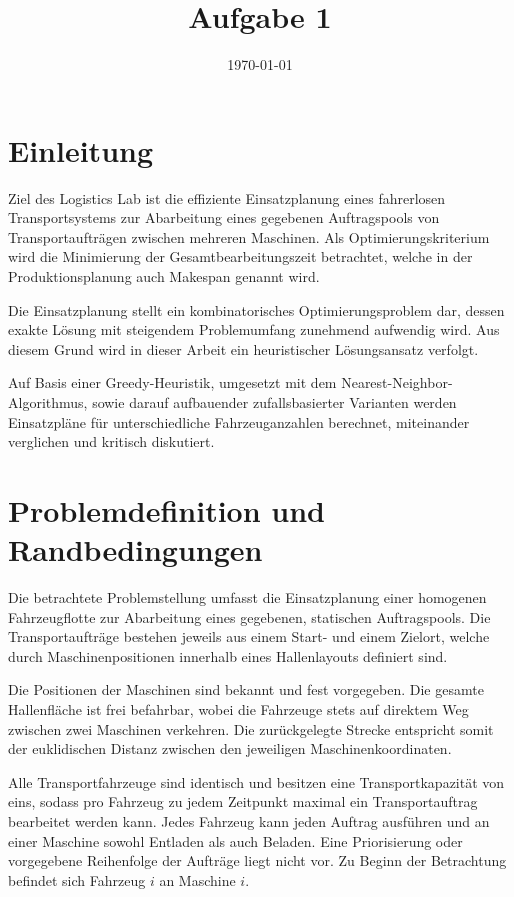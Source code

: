 \documentclass[a4paper,10pt]{article}
\title{Aufgabe 1}
\date{\today}
\begin{document}
\maketitle


\section{Einleitung}

Ziel des Logistics Lab ist die effiziente Einsatzplanung eines fahrerlosen Transportsystems zur
Abarbeitung eines gegebenen Auftragspools von Transportaufträgen zwischen mehreren Maschinen.
Als Optimierungskriterium wird die Minimierung der Gesamtbearbeitungszeit betrachtet, welche in der
Produktionsplanung auch Makespan genannt wird.

Die Einsatzplanung stellt ein kombinatorisches Optimierungsproblem dar, dessen exakte Lösung mit
steigendem Problemumfang zunehmend aufwendig wird. Aus diesem Grund wird in dieser Arbeit ein
heuristischer Lösungsansatz verfolgt.

Auf Basis einer Greedy-Heuristik, umgesetzt mit dem Nearest-Neighbor-Algorithmus, sowie darauf aufbauender
zufallsbasierter Varianten werden Einsatzpläne für unterschiedliche Fahrzeuganzahlen berechnet,
miteinander verglichen und kritisch diskutiert.

\section{Problemdefinition und Randbedingungen}

Die betrachtete Problemstellung umfasst die Einsatzplanung einer homogenen Fahrzeugflotte
zur Abarbeitung eines gegebenen, statischen Auftragspools. Die Transportaufträge
bestehen jeweils aus einem Start- und einem Zielort, welche durch Maschinenpositionen innerhalb
eines Hallenlayouts definiert sind.

Die Positionen der Maschinen sind bekannt und fest vorgegeben. Die gesamte Hallenfläche ist frei
befahrbar, wobei die Fahrzeuge stets auf direktem Weg zwischen zwei Maschinen verkehren. Die
zurückgelegte Strecke entspricht somit der euklidischen Distanz zwischen den jeweiligen
Maschinenkoordinaten.

Alle Transportfahrzeuge sind identisch und besitzen eine Transportkapazität von eins, sodass pro
Fahrzeug zu jedem Zeitpunkt maximal ein Transportauftrag bearbeitet werden kann. Jedes Fahrzeug
kann jeden Auftrag ausführen und an einer Maschine sowohl Entladen als auch Beladen. Eine Priorisierung 
oder vorgegebene Reihenfolge der Aufträge liegt
nicht vor. Zu Beginn der Betrachtung befindet sich Fahrzeug $i$ an Maschine $i$.
\end{document}
